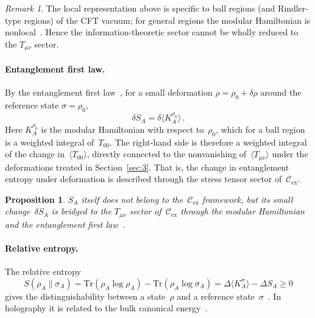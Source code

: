 \documentclass[
  aps,
  prd,
  preprint,
  groupedaddress,
  nofootinbib,
  longbibliography
]{revtex4-2}
\newtheorem{proposition}[definition]{Proposition}
\theoremstyle{remark}
\newtheorem{remark}[definition]{Remark}
\newcommand{\Cex}{\mathcal{C}_{\mathrm{ex}}}
\begin{document}
\begin{remark}\label{rem:modular-nonlocal}
The local representation above is specific to ball
regions (and Rindler-type regions) of the CFT vacuum; for
general regions the modular Hamiltonian is
nonlocal~\cite{ref34}.
Hence the information-theoretic sector cannot be wholly reduced
to the $T_{\mu\nu}$ sector.
\end{remark}

\paragraph{Entanglement first law.}
By the entanglement first law~\cite{ref35,ref37}, for a small
deformation $\rho=\rho_0+\delta\rho$ around the reference
state $\sigma=\rho_0$,
\begin{equation}\label{eq:first-law}
  \delta S_A = \delta\langle K_A^{\rho_0}\rangle\,.
\end{equation}
Here $K_A^{\rho_0}$ is the modular Hamiltonian with respect
to~$\rho_0$, which for a ball region is a weighted integral
of~$T_{00}$.
The right-hand side is therefore a weighted integral of the
change in~$\langle T_{00}\rangle$, directly connected to the
nonvanishing of~$\langle T_{\mu\nu}\rangle$ under the
deformations treated in Section~\ref{sec:3}.
That is, the change in entanglement entropy under deformation is
described through the stress tensor sector of~$\Cex$.

\begin{proposition}\label{prop:first-law}
$S_A$ itself does not belong to the~$\Cex$ framework, but its
small change~$\delta S_A$ is bridged to the $T_{\mu\nu}$ sector
of~$\Cex$ through the modular Hamiltonian and the entanglement
first law~\cite{ref34,ref35,ref37}.
\end{proposition}

\paragraph{Relative entropy.}
The relative entropy
\begin{equation}\label{eq:rel-entropy}
  S(\rho_A\|\sigma_A)
  = \mathrm{Tr}(\rho_A\log\rho_A)
    -\mathrm{Tr}(\rho_A\log\sigma_A)
  = \Delta\langle K_A^\sigma\rangle - \Delta S_A
  \geq 0
\end{equation}
gives the distinguishability between a state~$\rho$ and a
reference state~$\sigma$~\cite{ref35,ref36}.
In holography it is related to the bulk canonical
energy~\cite{ref36,ref37}.
\end{document}
